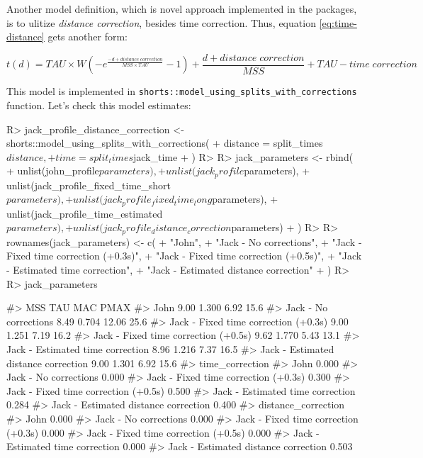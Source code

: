 \documentclass[
]{jss}
\begin{document}
Another model definition, which is novel approach implemented in the  packages, is to ulitize \emph{distance correction}, besides time correction. Thus, equation \eqref{eq:time-distance} gets another form:

\begin{equation}
  t(d) = TAU \times W(-e^{\frac{-d + distance \; correction}{MSS \times TAU}} - 1) + \frac{d + distance \; correction}{MSS} + TAU - time \; correction \label{eq:distance-correction}
\end{equation}

This model is implemented in \texttt{shorts::model\_using\_splits\_with\_corrections} function. Let's check this model estimates:

\begin{CodeChunk}
\begin{CodeInput}
R> jack_profile_distance_correction <- shorts::model_using_splits_with_corrections(
+   distance = split_times$distance,
+   time = split_times$jack_time
+ )
R> 
R> jack_parameters <- rbind(
+   unlist(john_profile$parameters),
+   unlist(jack_profile$parameters),
+   unlist(jack_profile_fixed_time_short$parameters),
+   unlist(jack_profile_fixed_time_long$parameters),
+   unlist(jack_profile_time_estimated$parameters),
+   unlist(jack_profile_distance_correction$parameters)
+ )
R> 
R> rownames(jack_parameters) <- c(
+   "John",
+   "Jack - No corrections",
+   "Jack - Fixed time correction (+0.3s)",
+   "Jack - Fixed time correction (+0.5s)",
+   "Jack - Estimated time correction",
+   "Jack - Estimated distance correction"
+ )
R> 
R> jack_parameters
\end{CodeInput}
\begin{CodeOutput}
#>                                       MSS   TAU   MAC PMAX
#> John                                 9.00 1.300  6.92 15.6
#> Jack - No corrections                8.49 0.704 12.06 25.6
#> Jack - Fixed time correction (+0.3s) 9.00 1.251  7.19 16.2
#> Jack - Fixed time correction (+0.5s) 9.62 1.770  5.43 13.1
#> Jack - Estimated time correction     8.96 1.216  7.37 16.5
#> Jack - Estimated distance correction 9.00 1.301  6.92 15.6
#>                                      time_correction
#> John                                           0.000
#> Jack - No corrections                          0.000
#> Jack - Fixed time correction (+0.3s)           0.300
#> Jack - Fixed time correction (+0.5s)           0.500
#> Jack - Estimated time correction               0.284
#> Jack - Estimated distance correction           0.400
#>                                      distance_correction
#> John                                               0.000
#> Jack - No corrections                              0.000
#> Jack - Fixed time correction (+0.3s)               0.000
#> Jack - Fixed time correction (+0.5s)               0.000
#> Jack - Estimated time correction                   0.000
#> Jack - Estimated distance correction               0.503
\end{CodeOutput}
\end{CodeChunk}
\end{document}
